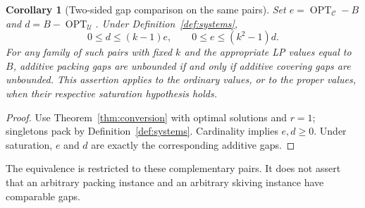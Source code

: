 \documentclass[11pt,a4paper]{article}
\newtheorem{corollary}[theorem]{Corollary}
\theoremstyle{definition}
\theoremstyle{remark}
\newcommand{\OPT}{\operatorname{OPT}}
\newcommand{\cC}{\mathcal C}
\newcommand{\cU}{\mathcal U}
\begin{document}
\begin{corollary}[Two-sided gap comparison on the same pairs]\label{cor:gap-equiv}
Set $e=\OPT_{\cC}-B$ and $d=B-\OPT_{\cU}$. Under Definition~\ref{def:systems},
\begin{equation}\label{eq:two-sided}
 0\le d\le(k-1)e,
 \qquad 0\le e\le(k^2-1)d.
\end{equation}
For any family of such pairs with fixed $k$ and the appropriate LP values equal to $B$, additive packing gaps are unbounded if and only if additive covering gaps are unbounded. This assertion applies to the ordinary values, or to the proper values, when their respective saturation hypothesis holds.
\end{corollary}
\begin{proof}
Use Theorem~\ref{thm:conversion} with optimal solutions and $r=1$; singletons pack by Definition~\ref{def:systems}. Cardinality implies $e,d\ge0$. Under saturation, $e$ and $d$ are exactly the corresponding additive gaps.
\end{proof}
The equivalence is restricted to these complementary pairs. It does not assert that an arbitrary packing instance and an arbitrary skiving instance have comparable gaps.
\end{document}
